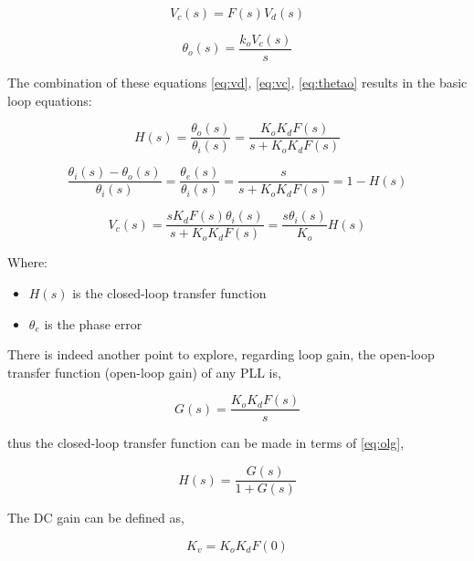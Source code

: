 \begin{equation}
    V_c(s)=F(s)V_d(s)
    \label{eq:vc}
\end{equation}

\begin{equation}
    \theta_o(s)=\frac{k_oV_c(s)}{s}
    \label{eq:thetao}
\end{equation}

The combination of these equations \ref{eq:vd}, \ref{eq:vc}, \ref{eq:thetao}
results in the basic loop equations:


\begin{equation}
    H(s)= \frac{\theta_o(s)}{\theta_i(s)}=
    \frac{K_oK_dF(s)}{s + K_oK_dF(s)}
    \label{eq:gentf}
\end{equation}

\begin{equation}
    \frac{\theta_i(s)-\theta_o(s)}{\theta_i(s)}=
    \frac{\theta_e(s)}{\theta_i(s)}=
    \frac{s}{s+K_oK_dF(s)}=1-H(s)
    \label{eq:pherr}
\end{equation}

\begin{equation}
    V_c(s)=\frac{sK_dF(s)\theta_i(s)}{s+K_oK_dF(s)}=
    \frac{s\theta_i(s)}{K_o}H(s)
    \label{eq:vchs}
\end{equation}

Where:

\begin{itemize}
    \item $H(s)$ is the closed-loop transfer function
    \item $\theta_e$ is the phase error
\end{itemize}

There is indeed another point to explore, regarding loop gain, the open-loop
transfer function (open-loop gain) of any PLL is,

\begin{equation}
    G(s)=\frac{K_oK_dF(s)}{s}
    \label{eq:olg}
\end{equation}

thus the closed-loop transfer function can be made in terms of \ref{eq:olg},

\begin{equation}
    H(s)=\frac{G(s)}{1+G(s)}
    \label{eq:clg}
\end{equation}

The DC gain can be defined as,

\begin{equation}
    K_v=K_oK_dF(0)
    \label{eq:dcgain}
\end{equation}

